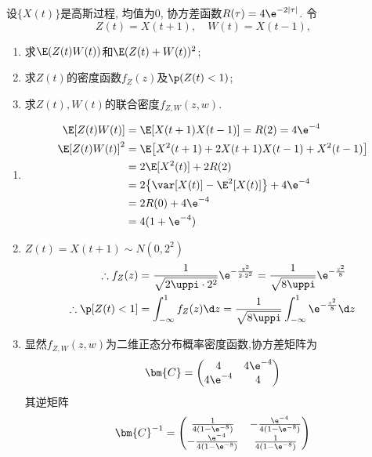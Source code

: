 \begin{problem}{4.7}
设$\{X(t)\}$是高斯过程, 均值为$0$, 协方差函数$R(\tau) = 4\e^{-2|\tau|}$. 令
\[Z(t) = X(t+1),\quad W(t) = X(t-1),\]
\begin{enumerate}[label=(\roman*)]
	\item 求$\E(Z(t)W(t))$和$\E(Z(t) + W(t))^2$;
	\item 求$Z(t)$的密度函数$f_Z(z)$及$\p(Z(t)<1)$;
	\item 求$Z(t), W(t)$的联合密度$f_{Z,W}(z,w)$.
\end{enumerate}
\end{problem}
\begin{solution}
	\begin{enumerate}[label=(\roman*)]
		\item \[
			      \begin{split}
				      \E[Z(t)W(t)] &= \E[X(t+1)X(t-1)] = R(2) = 4\e^{-4}\\
				      \E[Z(t)W(t)]^2 & = \E\big[X^2(t+1)+2X(t+1)X(t-1)+X^2(t-1)\big]\\
				      & = 2\E[X^2(t)]+2R(2)\\
				      & = 2\big\{\var[X(t)]-\E^2[X(t)]\big\} + 4\e^{-4}\\
				      & = 2R(0) + 4\e^{-4}\\
				      & = 4(1+\e^{-4})
			      \end{split}
		      \]
		\item $Z(t) = X(t+1) \sim N(0, 2^2)$
		      \[\begin{aligned}
				      \therefore f_Z(z)     & = \frac{1}{\sqrt{2\uppi \cdot 2^2}}\e^{-\frac{z^2}{2\cdot 2^2}} = \frac{1}{\sqrt{8\uppi}}\e^{-\frac{z^2}{8}} \\
				      \therefore \p[Z(t)<1] & = \int^1_{-\infty}f_Z(z)\d z = \frac{1}{\sqrt{8\uppi}}\int^1_{-\infty}\e^{-\frac{z^2}{8}}\d z
			      \end{aligned}\]
		\item 显然$f_{Z,W}(z,w)$为二维正态分布概率密度函数,协方差矩阵为
		      \[
			      \bm{C} =
			      \begin{pmatrix}
				      4        & 4\e^{-4} \\
				      4\e^{-4} & 4
			      \end{pmatrix}
		      \]
		      其逆矩阵
		      \[
			      \bm{C}^{-1}=
			      \begin{pmatrix}
				      \frac{1}{4(1-\e^{-8})}        & -\frac{\e^{-4}}{4(1-\e^{-8})} \\
				      -\frac{\e^{-4}}{4(1-\e^{-8})} & \frac{1}{4(1-\e^{-8})}

\end{pmatrix}\]
\end{enumerate}
\end{solution}
